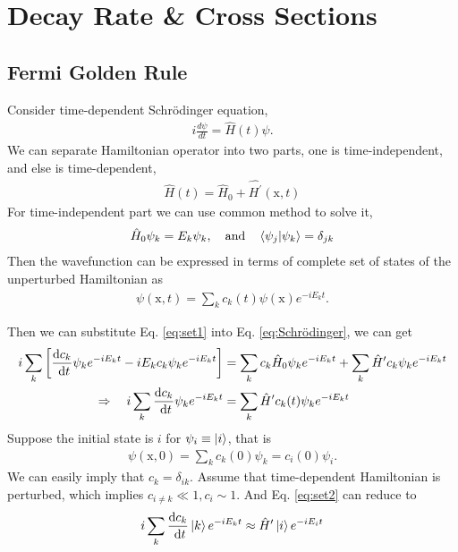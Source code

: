 \mainmatter
{}
\chapter{Decay Rate \& Cross Sections}


\section{Fermi Golden Rule}

Consider time-dependent Schrödinger equation,
\begin{align}
    i\frac{d \psi}{d t}=\hat{H}(t)\psi.\label{eq:Schrödinger}
\end{align}
We can separate Hamiltonian operator into two parts, one is time-independent, and else is time-dependent,
\begin{align}
    \hat{H}(t)=\hat{H}_{0}+\hat{H^{\prime}}(\mathrm{x},t)
\end{align}
For time-independent part we can use common method to solve it,
\begin{align}
    \hat{H}_{0}\psi_{k}=E_{k}\psi_{k},\quad \text{and} \quad \braket{\psi_{j}}{\psi_{k}}=\delta_{jk}
\end{align}
Then the wavefunction can be expressed in terms of complete set of states of the unperturbed Hamiltonian as
\begin{align}
    \psi(\mathrm{x},t)=\sum_{k}c_{k}(t)\psi(\mathrm{x})e^{-i E_{k}t}.\label{eq:set1}
\end{align}

Then we can substitute Eq. \ref{eq:set1} into Eq. \ref{eq:Schrödinger}, we can get 
\begin{align}
    i \sum_k\left[\frac{\mathrm{d} c_k}{\mathrm{~d} t} \psi_k e^{-i E_k t}-i E_k c_k \psi_k e^{-i E_k t}\right] & =\sum_k c_k \hat{H}_0 \psi_k e^{-i E_k t}+\sum_k \hat{H}^{\prime} c_k \psi_k e^{-i E_k t} \notag\\
    \Rightarrow \quad i \sum_k \frac{\mathrm{d} c_k}{\mathrm{~d} t} \psi_k e^{-i E_k t} & =\sum_k \hat{H}^{\prime} c_k(t) \psi_k e^{-i E_k t}\label{eq:set2}
\end{align}
Suppose the initial state is $i$ for $\psi_{i}\equiv \ket{i}$, that is 
\begin{align}
    \psi(\mathrm{x},0)=\sum_{k}c_{k}(0)\psi_{k}=c_{i}(0)\psi_{i}.
\end{align}
We can easily imply that $c_{k}=\delta_{ik}$. Assume that time-dependent Hamiltonian is perturbed, which implies $c_{i\neq k}\ll 1, c_{i}\sim 1$. And Eq. \ref{eq:set2} can reduce to 
\begin{align}
    i \sum_k \frac{\mathrm{d} c_k}{\mathrm{~d} t} \ket{k} e^{-i E_k t} \approx \hat{H}^{\prime} \ket{i} e^{-i E_i t}\label{eq:perturbed}
\end{align}

